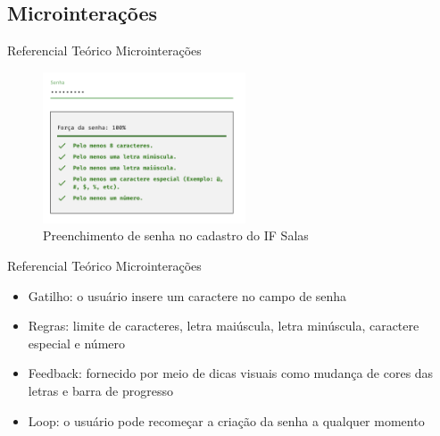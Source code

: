\subsection{Microinterações}
\begin{frame}{Referencial Teórico}
	{Microinterações}
	\begin{figure}
		\includegraphics[width=6cm]{images/senha.png}
		\caption{Preenchimento de senha no cadastro do IF Salas}
	\end{figure}
\end{frame}

\begin{frame}{Referencial Teórico}
	{Microinterações}
	\begin{itemize}[<+->]
		\item Gatilho: o usuário insere um caractere no campo de senha
		\item Regras: limite de caracteres, letra maiúscula, letra minúscula, caractere especial e número
		\item Feedback: fornecido por meio de dicas visuais como mudança de cores das letras e barra de progresso
		\item Loop: o usuário pode recomeçar a criação da senha a qualquer momento
	\end{itemize}
\end{frame}